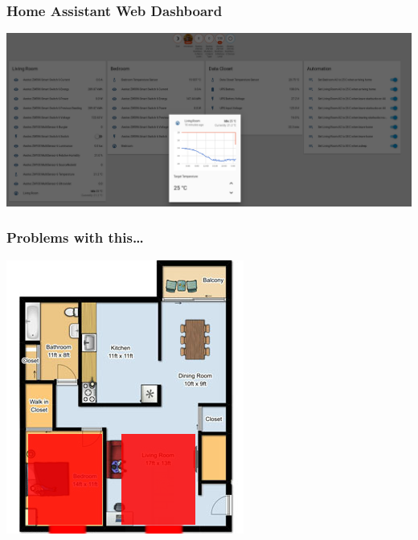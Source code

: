 \documentclass[aspectratio=169,11pt,hyperref={colorlinks=true}]{beamer}
\begin{document}
\begin{frame}
    \frametitle{Home Assistant Web Dashboard}
    \begin{center}
        \includegraphics[width=\textwidth]{Control_panel.png}
    \end{center}
\end{frame}

\begin{frame}
    \frametitle{Problems with this\dots}
    \begin{center}
    \includegraphics[height=.85\textheight]{floorplan-zones.png}
    \end{center}
\end{frame}
\end{document}
